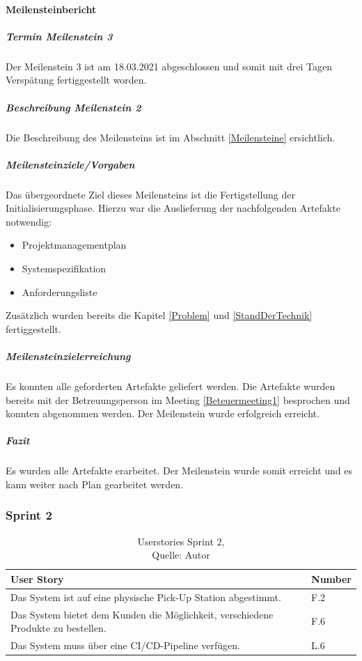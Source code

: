 \paragraph{Meilensteinbericht}
\subparagraph{Termin Meilenstein 3}
Der Meilenstein 3 ist am 18.03.2021 abgeschlossen und somit mit drei Tagen Verspätung fertiggestellt worden. 
\subparagraph{Beschreibung Meilenstein 2}
Die Beschreibung des Meilensteins ist im Abschnitt \ref{Meilensteine} ersichtlich. 
\subparagraph{Meilensteinziele/Vorgaben}
Das übergeordnete Ziel dieses Meilensteins ist die Fertigstellung der Initialisierungsphase.
Hierzu war die Auslieferung der nachfolgenden Artefakte notwendig:
\begin{itemize}
	\item Projektmanagementplan
	\item Systemspezifikation
	\item Anforderungsliste
\end{itemize}
Zusätzlich wurden bereits die Kapitel \ref{Problem} und \ref{StandDerTechnik} fertiggestellt. 
\subparagraph{Meilensteinzielerreichung}
Es konnten alle geforderten Artefakte geliefert werden. Die Artefakte wurden bereits mit der Betreuungsperson im Meeting \ref{Beteuermeeting1} besprochen und konnten abgenommen werden. 
Der Meilenstein wurde erfolgreich erreicht. 
\subparagraph{Fazit}
Es wurden alle Artefakte erarbeitet. Der Meilenstein wurde somit erreicht und es kann weiter nach Plan gearbeitet werden.

\subsubsection{Sprint 2}\label{sprint2}
\begin{table}[H]
	\begin{tabularx}{\textwidth}{|l|X|}
		\hline
		\textbf{User Story} & \textbf{Number} \\
		\hline
		Das System ist auf eine physische Pick-Up Station abgestimmt. & F.2\\
		\hline
		Das System bietet dem Kunden die Möglichkeit, verschiedene Produkte zu bestellen. & F.6\\
		\hline
		Das System muss über eine CI/CD-Pipeline verfügen. & L.6 \\
		\hline
	\end{tabularx} 
	\caption[Userstories Sprint 2]{Userstories Sprint 2,\\ Quelle: Autor}
\end{table}\label{userStoriesSprint2}

